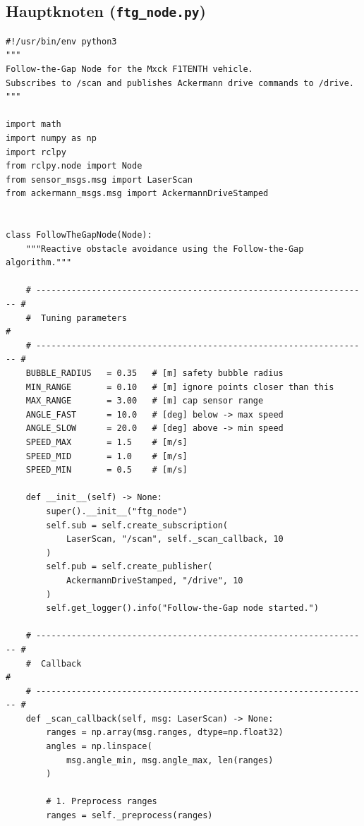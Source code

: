 \subsection{Hauptknoten (\texttt{ftg\_node.py})}
\label{subsec:ftg_node}

\begin{lstlisting}[language=Python3,
                   caption={FTG-Hauptknoten (vereinfacht)},
                   label={lst:ftg_node}]
#!/usr/bin/env python3
"""
Follow-the-Gap Node for the Mxck F1TENTH vehicle.
Subscribes to /scan and publishes Ackermann drive commands to /drive.
"""

import math
import numpy as np
import rclpy
from rclpy.node import Node
from sensor_msgs.msg import LaserScan
from ackermann_msgs.msg import AckermannDriveStamped


class FollowTheGapNode(Node):
    """Reactive obstacle avoidance using the Follow-the-Gap algorithm."""

    # ------------------------------------------------------------------ #
    #  Tuning parameters                                                   #
    # ------------------------------------------------------------------ #
    BUBBLE_RADIUS   = 0.35   # [m] safety bubble radius
    MIN_RANGE       = 0.10   # [m] ignore points closer than this
    MAX_RANGE       = 3.00   # [m] cap sensor range
    ANGLE_FAST      = 10.0   # [deg] below -> max speed
    ANGLE_SLOW      = 20.0   # [deg] above -> min speed
    SPEED_MAX       = 1.5    # [m/s]
    SPEED_MID       = 1.0    # [m/s]
    SPEED_MIN       = 0.5    # [m/s]

    def __init__(self) -> None:
        super().__init__("ftg_node")
        self.sub = self.create_subscription(
            LaserScan, "/scan", self._scan_callback, 10
        )
        self.pub = self.create_publisher(
            AckermannDriveStamped, "/drive", 10
        )
        self.get_logger().info("Follow-the-Gap node started.")

    # ------------------------------------------------------------------ #
    #  Callback                                                            #
    # ------------------------------------------------------------------ #
    def _scan_callback(self, msg: LaserScan) -> None:
        ranges = np.array(msg.ranges, dtype=np.float32)
        angles = np.linspace(
            msg.angle_min, msg.angle_max, len(ranges)
        )

        # 1. Preprocess ranges
        ranges = self._preprocess(ranges)


\end{lstlisting}
